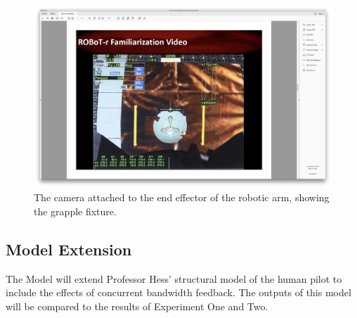 \documentclass{paper}
\begin{document}
\begin{figure}[tb!]
    \begin{center}
        \includegraphics[trim={13cm 5cm 22cm 15.5cm},clip,width=\linewidth]{img/Screen Shot 2018-07-26 at 1.43.05 PM.png}
        \caption{The camera attached to the end effector of the robotic arm, showing the grapple fixture.}
    \end{center}
\end{figure}




\subsection{Model Extension}
The Model will extend Professor Hess’ structural model of the human pilot to include the effects of concurrent bandwidth feedback.
The outputs of this model will be compared to the results of Experiment One and Two.
\end{document}
